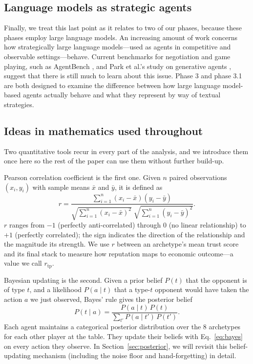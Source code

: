 \documentclass[10pt,twocolumn,letterpaper]{article}
\newcommand{\rtp}{\ensuremath{r_{\mathrm{tp}}}}
\begin{document}
\subsection{Language models as strategic agents}
Finally, we treat this last point as it relates to two of our phases,
because these phases employ large language models. An increasing
amount of work concerns how strategically large language
models---used as agents in competitive and observable
settings---behave. Current benchmarks for negotiation and game
playing, such as AgentBench \citep{liu2024agentbench}, and Park et
al.'s study on generative agents \citep{park2023generative}, suggest
that there is still much to learn about this issue. Phase 3 and
phase 3.1 are both designed to examine the difference between how
large language model-based agents actually behave and what they
represent by way of textual strategies.

\subsection{Ideas in mathematics used throughout}
Two quantitative tools recur in every part of the analysis, and we
introduce them once here so the rest of the paper can use them
without further build-up.

Pearson correlation coefficient is the first one. Given $n$ paired
observations $(x_i, y_i)$ with sample means $\bar{x}$ and
$\bar{y}$, it is defined as
\begin{equation}
  r = \frac{\sum_{i=1}^{n}(x_i-\bar{x})(y_i-\bar{y})}
           {\sqrt{\sum_{i=1}^{n}(x_i-\bar{x})^2}\;
            \sqrt{\sum_{i=1}^{n}(y_i-\bar{y})^2}}.
  \label{eq:pearson}
\end{equation}
$r$ ranges from $-1$ (perfectly anti-correlated) through $0$ (no
linear relationship) to $+1$ (perfectly correlated); the sign
indicates the direction of the relationship and the magnitude its
strength. We use $r$ between an archetype's mean trust score and
its final stack to measure how reputation maps to economic
outcome---a value we call \rtp.

Bayesian updating is the second. Given a prior belief $P(t)$ that
the opponent is of type $t$, and a likelihood $P(a\mid t)$ that a
type-$t$ opponent would have taken the action $a$ we just
observed, Bayes' rule gives the posterior belief
\begin{equation}
  P(t\mid a) = \frac{P(a\mid t)\,P(t)}
                    {\sum_{t'} P(a\mid t')\,P(t')}.
  \label{eq:bayes}
\end{equation}
Each agent maintains a categorical posterior distribution over the
8 archetypes for each other player at the table. They update their
beliefs with Eq.~\ref{eq:bayes} on every action they observe. In
Section~\ref{sec:posterior}, we will revisit this belief-updating
mechanism (including the noise floor and hand-forgetting) in detail.
\end{document}

